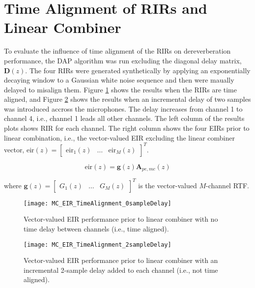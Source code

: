 \section{Time Alignment of RIRs and Linear Combiner}

To evaluate the influence of time alignment of the RIRs on dereverberation performance, the DAP algorithm was run excluding the diagonal delay matrix, $\boldsymbol{D}(z)$. The four RIRs were generated synthetically by applying an exponentially decaying window to a Gaussian white noise sequence and then were maually delayed to misalign them. Figure \ref{fig:params_MC_EIR_TimeAlignment_0sampleDelay} shows the results when the RIRs are time aligned, and Figure \ref{fig:params_MC_EIR_TimeAlignment_2sampleDelay} shows the results when an incremental delay of two samples was introduced accross the microphones. The delay increases from channel 1 to channel 4, i.e., channel 1 leads all other channels. The left column of the results plots shows RIR for each channel. The right column shows the four EIRs prior to linear combination, i.e., the vector-valued EIR excluding the linear combiner vector, $\boldsymbol{\mathrm{eir}}(z) = \begin{bmatrix} \mathrm{eir}_1 (z)& \dots & \mathrm{eir}_M(z) \end{bmatrix}^T$. 

\begin{equation}
	\boldsymbol{\mathrm{eir}}(z) = \boldsymbol{g}(z)\boldsymbol{A}_{pe,mc}(z)
\end{equation}

\noindent
where $\boldsymbol{g}(z) = \begin{bmatrix} G_1(z)& \dots & G_M(z) \end{bmatrix}^T$ is the vector-valued $M$-channel RTF.



\begin{figure}[H]
	\texttt{[image: MC\_EIR\_TimeAlignment\_0sampleDelay]}
	\centering
	\caption{Vector-valued EIR performance prior to linear combiner with no time delay between channels (i.e., time aligned).}
	\label{fig:params_MC_EIR_TimeAlignment_0sampleDelay}
\end{figure}

\begin{figure}[H]
	\texttt{[image: MC\_EIR\_TimeAlignment\_2sampleDelay]}
	\centering
	\caption{Vector-valued EIR performance prior to linear combiner with an incremental 2-sample delay added to each channel (i.e., not time aligned).}
	\label{fig:params_MC_EIR_TimeAlignment_2sampleDelay}
\end{figure}


